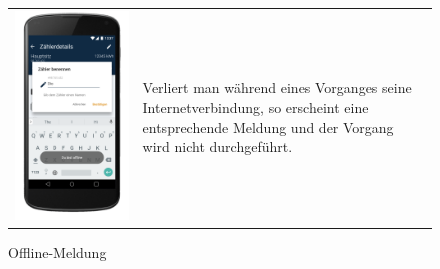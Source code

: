 \begin{figure}[h]
\begin{tabularx}{\textwidth}{X  X}
	\includegraphics[scale = 0.155]{img/AndroidMockup/renameException} \caption{Offline-Meldung} & Verliert man während eines Vorganges seine Internetverbindung, so erscheint eine entsprechende Meldung und der Vorgang wird nicht durchgeführt.  \\ 
\end{tabularx}
\end{figure}

